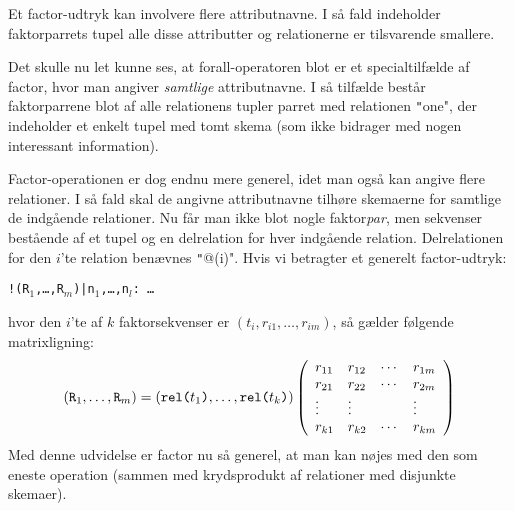 \documentclass{article}
\newcounter{eks}
\begin{document}
Et factor-udtryk kan involvere flere attributnavne. I s\aa{} fald indeholder
faktorparrets tupel alle disse attributter og relationerne er tilsvarende
smallere. 


Det skulle nu let kunne ses, at forall-operatoren blot er et specialtilf\ae{}lde
af factor, hvor man angiver {\em samtlige\/} attributnavne. I s\aa{} tilf\ae{}lde
best\aa{}r faktorparrene blot af alle relationens tupler parret med
relationen \texttt"one", der indeholder et enkelt tupel med tomt skema
(som ikke bidrager med nogen interessant information).

Factor-operationen er dog endnu mere generel, idet man ogs\aa{} kan angive
flere relationer. I s\aa{} fald skal de angivne attributnavne tilh\o{}re
skemaerne for samtlige de indg\aa{}ende relationer. Nu f\aa{}r man ikke blot
nogle faktor{\em par}, men sekvenser best\aa{}ende af et tupel og en delrelation for
hver indg\aa{}ende relation. Delrelationen for den $i$'te relation ben\ae{}vnes
\texttt"@(i)". Hvis vi betragter et generelt factor-udtryk:
\begin{center}
{\tt !(R$_1$,\ldots,R$_m$)|n$_1$,\ldots,n$_l$: \ldots}
\end{center}
hvor den $i$'te af $k$ faktorsekvenser er $(t_i,r_{i1},\ldots,r_{im})$, s\aa{}
g\ae{}lder f\o{}lgende matrixligning:
$$ (\mbox{\tt R}_1,\ldots,\mbox{\tt R}_m) = 
   (\mbox{\tt rel(}t_1\mbox{\tt )},\ldots,\mbox{\tt rel(}t_k\mbox{\tt )})
   \left(\begin{array}{llll}
   r_{11} & r_{12} & \cdots & r_{1m} \\
   r_{21} & r_{22} & \cdots & r_{2m} \\
   \vdots & \vdots & & \vdots \\
   r_{k1} & r_{k2} & \cdots & r_{km} 
   \end{array}\right)
$$
Med denne udvidelse er factor nu s\aa{} generel, at man kan n\o{}jes med
den som eneste operation (sammen med krydsprodukt af relationer med
disjunkte skemaer).
\end{document}
